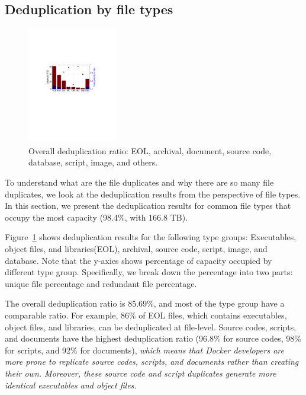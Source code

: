 
\subsection{Deduplication by file types}

\begin{figure} 
	\centering
	\includegraphics[width=0.35\textwidth]{graphs/dedup-overall} 
	\caption{Overall deduplication ratio: EOL, archival, document, source code, database, script, image, and others.} 
	\label{fig:dedup-overall} 
\end{figure}

%		
%
To understand what are the file duplicates and why there are so many file
duplicates, we look at the deduplication results from the perspective of file
types. 
%
In this section, we present the deduplication results for common file
types that occupy the most capacity (98.4\%, with 166.8 TB).

Figure~\ref{fig:dedup-overall} shows deduplication results for the following
type groups: Executables, object files, and libraries(EOL), archival, source
code, script, image, and database. 
%
Note that the y-axies shows percentage of
capacity occupied by different type group. 
%
Specifically, we break down the
percentage into two parts: unique file percentage and redundant file
percentage.

The overall deduplication ratio is 85.69\%, and most of the type group have a
comparable ratio. 
%
For example, 86\% of EOL files, which contains executables,
object files, and libraries, can be deduplicated at file-level.  
%
Source codes,
scripts, and documents have the highest deduplication ratio (96.8\% for source
codes, 98\% for scripts, and 92\% for documents), \textit{which means that
Docker developers are more prone to replicate source codes, scripts, and
documents rather than creating their own. 
%
Moreover, these source code and
script duplicates generate more identical executables and object files.} 

